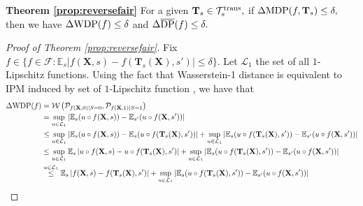 \documentclass[10pt]{article} %
\begin{document}

\clearpage

\textbf{Theorem \ref{prop:reversefair}}
    For a given $\mathbf{T}_{s} \in \mathcal{T}_{s}^{\textup{trans}},$
    if $\Delta \textup{MDP} (f, \mathbf{T}_{s}) \le \delta,$
    then we have $\Delta \textup{WDP} ( f )\le \delta$ and $\Delta \overline{\textup{DP}} ( f ) \le \delta.$

\begin{proof}[Proof of Theorem \ref{prop:reversefair}]
    Fix $f \in \{ f \in \mathcal{F} : \mathbb{E}_{s} \vert f(\mathbf{X}, s) - f(\mathbf{T}_{s}(\mathbf{X}), s') \vert \le \delta \}.$
    Let $\mathcal{L}_{1}$ the set of all $1$-Lipschitz functions.
    Using the fact that Wasserstein-1 distance is equivalent to IPM induced by set of $1$-Lipschitz function \citep{villani2008optimal}, we have that
    \begin{equation}\label{proof:theory:sdp}
        \begin{split}
            \Delta \textup{WDP} (f)
            & = \mathcal{W} \left( \mathcal{P}_{f(\mathbf{X}, 0) | S = 0}, \mathcal{P}_{f(\mathbf{X}, 1) | S = 1} \right) \\
            & = \sup_{u \in \mathcal{L}_{1}}
            \left| \mathbb{E}_{s} ( u \circ f(\mathbf{X}, s) ) - \mathbb{E}_{s'} ( u \circ f(\mathbf{X}, s') ) \right| \\
            & \le \sup_{u \in \mathcal{L}_{1}} \left| \mathbb{E}_{s} ( u \circ f(\mathbf{X}, s) ) - \mathbb{E}_{s} ( u \circ f(\mathbf{T}_{s}(\mathbf{X}), s') ) \right|
            + \sup_{u \in \mathcal{L}_{1}} \left| \mathbb{E}_{s} ( u \circ f(\mathbf{T}_{s}(\mathbf{X}), s') ) - \mathbb{E}_{s'} ( u \circ f(\mathbf{X}, s') ) \right| \\
            & \le \sup_{u \in \mathcal{L}_{1}} \mathbb{E}_{s} \left|   u \circ f(\mathbf{X}, s) -  u \circ f(\mathbf{T}_{s}(\mathbf{X}), s' ) \right|
            + \sup_{u \in \mathcal{L}_{1}} \left| \mathbb{E}_{s} ( u \circ f(\mathbf{T}_{s}(\mathbf{X}), s') ) - \mathbb{E}_{s'} ( u \circ f(\mathbf{X}, s') ) \right| \\
            & \overset{u \in \mathcal{L}_{1}}{\le} \mathbb{E}_{s} \left|  f(\mathbf{X}, s) - f(\mathbf{T}_{s}(\mathbf{X}), s') \right|
            + \sup_{u \in \mathcal{L}_{1}} \left| \mathbb{E}_{s} ( u \circ f(\mathbf{T}_{s}(\mathbf{X}), s') ) - \mathbb{E}_{s'} ( u \circ f(\mathbf{X}, s') ) \right| \\

\end{split}
\end{equation}
\end{proof}
\end{document}
